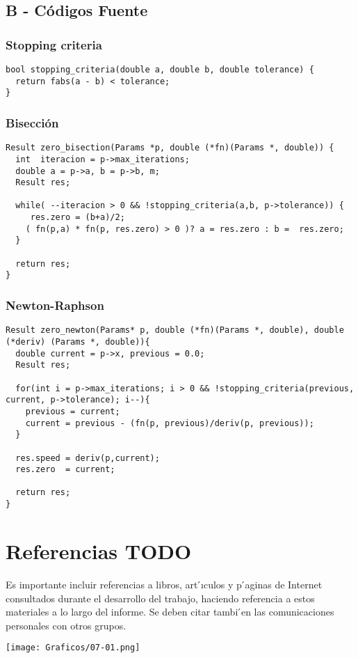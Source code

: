 \documentclass[a4paper]{article}
\begin{document}
\subsection{B - Códigos Fuente}

\subsubsection{Stopping criteria}
\begin{verbatim}
bool stopping_criteria(double a, double b, double tolerance) {
  return fabs(a - b) < tolerance;
}
\end{verbatim}

\subsubsection{Bisección}
\begin{verbatim}
Result zero_bisection(Params *p, double (*fn)(Params *, double)) {
  int  iteracion = p->max_iterations;
  double a = p->a, b = p->b, m;
  Result res;

  while( --iteracion > 0 && !stopping_criteria(a,b, p->tolerance)) {
     res.zero = (b+a)/2;
    ( fn(p,a) * fn(p, res.zero) > 0 )? a = res.zero : b =  res.zero;
  }

  return res;
}
\end{verbatim}


\subsubsection{Newton-Raphson}
\begin{verbatim}
Result zero_newton(Params* p, double (*fn)(Params *, double), double (*deriv) (Params *, double)){
  double current = p->x, previous = 0.0;
  Result res;

  for(int i = p->max_iterations; i > 0 && !stopping_criteria(previous, current, p->tolerance); i--){
    previous = current;
    current = previous - (fn(p, previous)/deriv(p, previous));
  }

  res.speed = deriv(p,current);
  res.zero  = current;

  return res;
}
\end{verbatim}

\newpage

\section{Referencias TODO}
Es importante incluir referencias a libros, art ́ıculos y p ́aginas de Internet consultados durante el desarrollo del trabajo, haciendo referencia a estos materiales a lo largo del informe. Se deben citar tambi ́en las comunicaciones personales con otros grupos.

\begin{center}
	\texttt{[image: Graficos/07-01.png]}
\end{center}
\end{document}
